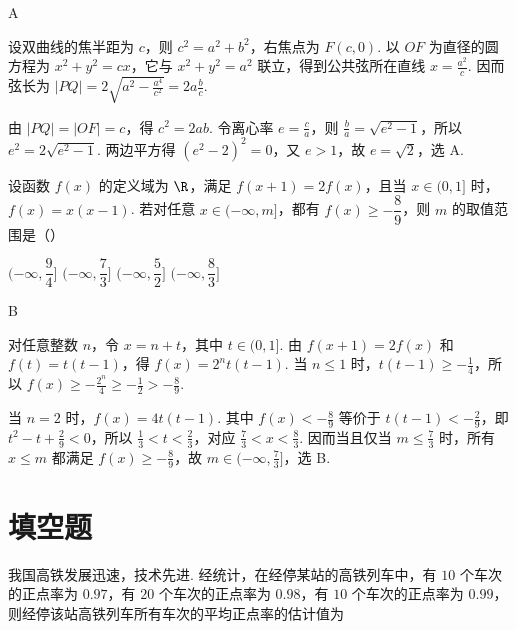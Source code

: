 \begin{answer}
A
\end{answer}

\begin{solution}
设双曲线的焦半距为 \(c\)，则 \(c^2=a^2+b^2\)，右焦点为 \(F(c,0)\). 以 \(OF\) 为直径的圆方程为 \(x^2+y^2=cx\)，它与 \(x^2+y^2=a^2\) 联立，得到公共弦所在直线 \(x=\frac{a^2}{c}\). 因而弦长为 \(|PQ|=2\sqrt{a^2-\frac{a^4}{c^2}}=2a\frac{b}{c}\).

由 \(|PQ|=|OF|=c\)，得 \(c^2=2ab\). 令离心率 \(e=\frac{c}{a}\)，则 \(\frac{b}{a}=\sqrt{e^2-1}\)，所以 \(e^2=2\sqrt{e^2-1}\). 两边平方得 \((e^2-2)^2=0\)，又 \(e>1\)，故 \(e=\sqrt2\)，选 A.
\end{solution}

\begin{problem}
设函数 \(f(x)\) 的定义域为 \(\R\)，满足 \(f(x+1)=2f(x)\)，且当 \(x\in(0,1]\) 时，\(f(x)=x(x-1)\). 若对任意 \(x\in(-\infty,m]\)，都有 \(f(x)\ge -\dfrac89\)，则 \(m\) 的取值范围是（\quad）

\choices
    {\((-\infty,\dfrac94]\)}
    {\((-\infty,\dfrac73]\)}
    {\((-\infty,\dfrac52]\)}
    {\((-\infty,\dfrac83]\)}
\end{problem}

\begin{answer}
B
\end{answer}

\begin{solution}
对任意整数 \(n\)，令 \(x=n+t\)，其中 \(t\in(0,1]\). 由 \(f(x+1)=2f(x)\) 和 \(f(t)=t(t-1)\)，得 \(f(x)=2^n t(t-1)\). 当 \(n\leq1\) 时，\(t(t-1)\geq-\frac{1}{4}\)，所以 \(f(x)\geq-\frac{2^n}{4}\geq-\frac{1}{2}>-\frac{8}{9}\).

当 \(n=2\) 时，\(f(x)=4t(t-1)\). 其中 \(f(x)<-\frac{8}{9}\) 等价于 \(t(t-1)<-\frac{2}{9}\)，即 \(t^2-t+\frac{2}{9}<0\)，所以 \(\frac{1}{3}<t<\frac{2}{3}\)，对应 \(\frac{7}{3}<x<\frac{8}{3}\). 因而当且仅当 \(m\leq\frac{7}{3}\) 时，所有 \(x\leq m\) 都满足 \(f(x)\geq-\frac{8}{9}\)，故 \(m\in(-\infty,\frac{7}{3}]\)，选 B.
\end{solution}

\section{填空题}

\begin{problem}
我国高铁发展迅速，技术先进. 经统计，在经停某站的高铁列车中，有 \(10\) 个车次的正点率为 \(0.97\)，有 \(20\) 个车次的正点率为 \(0.98\)，有 \(10\) 个车次的正点率为 \(0.99\)，则经停该站高铁列车所有车次的平均正点率的估计值为\fillinblank{}
\end{problem}

